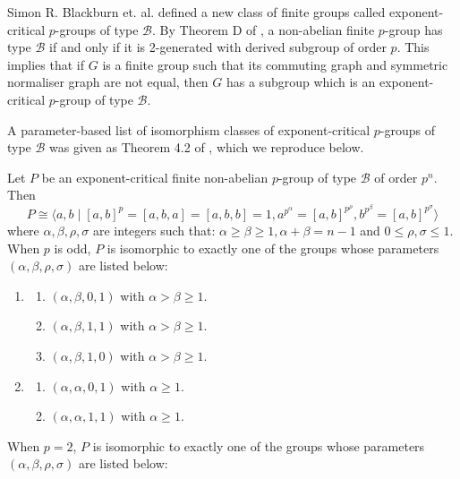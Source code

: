 Simon R. Blackburn et. al. \cite{BCMV2025} defined a new class of finite groups called exponent-critical $p$-groups of type $\mathcal{B}$. By Theorem D of \cite{BCMV2025}, a non-abelian finite $p$-group has type $\mathcal{B}$ if and only if it is 2-generated with derived subgroup of order $p$. This implies that if $G$ is a finite group such that its commuting graph and symmetric normaliser graph are not equal, then $G$ has a subgroup which is an exponent-critical $p$-group of type $\mathcal{B}$. 
\par
A parameter-based list of isomorphism classes of exponent-critical $p$-groups of type $\mathcal{B}$ was given as Theorem 4.2 of \cite{BCMV2025}, which we reproduce below.
\begin{lemma}\label{ECG_thm}
    Let $P$ be an exponent-critical finite non-abelian $p$-group of type $\mathcal{B}$ of order $p^n$. Then 
    $$P \cong \langle a,b \mid [a,b]^p = [a,b,a] = [a,b,b] = 1, a^{p^{\alpha}} = [a,b]^{p^{\rho}}, b^{p^{\beta}} = [a,b]^{p^{\sigma}} \rangle$$ where $\alpha, \beta, \rho, \sigma$ are integers such that: $ \alpha \geq \beta \geq 1, \alpha + \beta = n-1$ and $ 0 \leq \rho, \sigma \leq 1 $. When $p$ is odd, $P$ is isomorphic to exactly one of the groups whose parameters $(\alpha, \beta, \rho, \sigma)$ are listed below:
    \begin{enumerate}
        \item[A1.]   \begin{enumerate}
                    \item $(\alpha, \beta, 0, 1)$ with $\alpha > \beta \geq 1$. \label{p_1a}
                    \item $(\alpha, \beta, 1, 1)$ with $\alpha > \beta \geq 1$. \label{p_1b}
                    \item $(\alpha, \beta, 1, 0)$ with $\alpha > \beta \geq 1$. \label{p_1c}
                \end{enumerate}
        \item[A2.]  \begin{enumerate}
                    \item $(\alpha, \alpha, 0, 1)$ with $\alpha \geq 1$. \label{p_2a}
                    \item $(\alpha, \alpha, 1, 1)$ with $\alpha \geq 1$. \label{p_2b}
                \end{enumerate}
    \end{enumerate}
    When $p=2$, $P$ is isomorphic to exactly one of the groups whose parameters $(\alpha, \beta, \rho, \sigma)$ are listed below:

\end{lemma}
